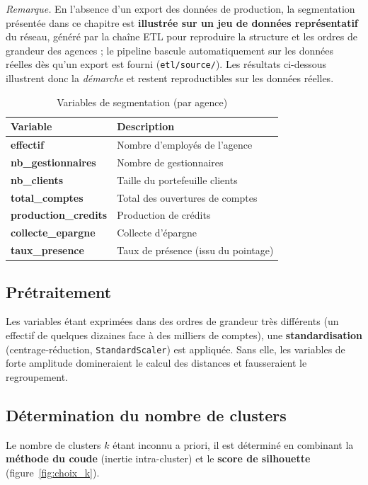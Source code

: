 \medskip\noindent\emph{Remarque.} En l'absence d'un export des données de
production, la segmentation présentée dans ce chapitre est \textbf{illustrée sur un
jeu de données représentatif} du réseau, généré par la chaîne ETL pour reproduire
la structure et les ordres de grandeur des agences ; le pipeline bascule
automatiquement sur les données réelles dès qu'un export est fourni
(\texttt{etl/source/}). Les résultats ci-dessous illustrent donc la
\emph{démarche} et restent reproductibles sur les données réelles.

\begin{table}[htbp]
\centering
\caption{Variables de segmentation (par agence)}
\label{tab:variables_clustering}
\renewcommand{\arraystretch}{1.2}
\begin{tabularx}{\textwidth}{>{\bfseries}p{4cm}X}
\toprule
\textmd{\textbf{Variable}} & \textbf{Description}\\
\midrule
effectif & Nombre d'employés de l'agence\\
nb\_gestionnaires & Nombre de gestionnaires\\
nb\_clients & Taille du portefeuille clients\\
total\_comptes & Total des ouvertures de comptes\\
production\_credits & Production de crédits\\
collecte\_epargne & Collecte d'épargne\\
taux\_presence & Taux de présence (issu du pointage)\\
\bottomrule
\end{tabularx}
\end{table}

\subsection{Prétraitement}
Les variables étant exprimées dans des ordres de grandeur très différents (un
effectif de quelques dizaines face à des milliers de comptes), une
\textbf{standardisation} (centrage-réduction, \texttt{StandardScaler}) est
appliquée. Sans elle, les variables de forte amplitude domineraient le calcul des
distances et fausseraient le regroupement.

\subsection{Détermination du nombre de clusters}
Le nombre de clusters $k$ étant inconnu a priori, il est déterminé en combinant la
\textbf{méthode du coude} (inertie intra-cluster) et le \textbf{score de
silhouette} (figure~\ref{fig:choix_k}).

